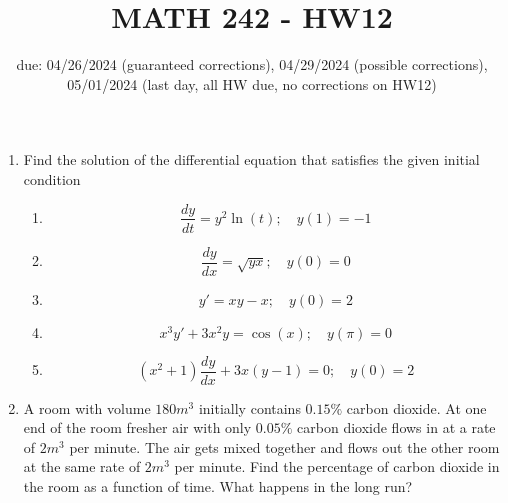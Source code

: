 \documentclass[12pt]{article}
\title{MATH 242 - HW12}
\date{due: 04/26/2024 (guaranteed corrections), 04/29/2024 (possible corrections), 05/01/2024 (last day, all HW due, no corrections on HW12)}
\begin{document}
\maketitle

\begin{enumerate}

\item Find the solution of the differential equation that satisfies the given initial condition
\begin{enumerate}
    \item $$\frac{dy}{dt}=y^2\ln(t);\quad y(1)=-1$$
    \newpage
    \item $$\frac{dy}{dx}=\sqrt{yx};\quad y(0)=0$$
    \vfill
    \item $$y'=xy-x;\quad y(0)=2$$
    \vfill
    \newpage
    \item $$x^3y'+3x^2y=\cos(x);\quad y(\pi)=0$$
    \vfill
    \item $$(x^2+1)\frac{dy}{dx}+3x(y-1)=0;\quad y(0)=2$$
    \vfill
    \newpage
\end{enumerate}
\item A room with volume $180m^3$ initially contains $0.15\%$ carbon dioxide. At one end of the room fresher air with only $0.05\%$ carbon dioxide flows in at a rate of $2m^3$ per minute. The air gets mixed together and flows out the other room at the same rate of $2m^3$ per minute. Find the percentage of carbon dioxide in the room as a function of time. What happens in the long run?

\end{enumerate}
\end{document}
